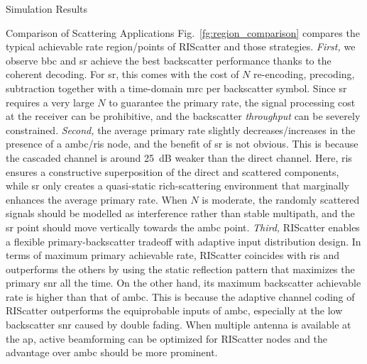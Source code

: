 \documentclass[journal]{IEEEtran}
\begin{document}
\begin{section}{Simulation Results}
\begin{subsection}{Comparison of Scattering Applications}
		Fig.~\ref{fg:region_comparison} compares the typical achievable rate region/points of RIScatter and those strategies.
		\emph{First,} we observe \gls{bbc} and \gls{sr} achieve the best backscatter performance thanks to the coherent decoding.
		For \gls{sr}, this comes with the cost of $N$ re-encoding, precoding, subtraction together with a time-domain \gls{mrc} per backscatter symbol.
		Since \gls{sr} requires a very large $N$ to guarantee the primary rate, the signal processing cost at the receiver can be prohibitive, and the backscatter \emph{throughput} can be severely constrained.
		\emph{Second,} the average primary rate slightly decreases/increases in the presence of a \gls{ambc}/\gls{ris} node, and the benefit of \gls{sr} is not obvious.
		This is because the cascaded channel is around \qty{25}{dB} weaker than the direct channel.
		Here, \gls{ris} ensures a constructive superposition of the direct and scattered components, while \gls{sr} only creates a quasi-static rich-scattering environment that marginally enhances the average primary rate.
		When $N$ is moderate, the randomly scattered signals should be modelled as interference rather than stable multipath, and the \gls{sr} point should move vertically towards the \gls{ambc} point.
		\emph{Third,} RIScatter enables a flexible primary-backscatter tradeoff with adaptive input distribution design.
		In terms of maximum primary achievable rate, RIScatter coincides with \gls{ris} and outperforms the others by using the static reflection pattern that maximizes the primary \gls{snr} all the time.
		On the other hand, its maximum backscatter achievable rate is higher than that of \gls{ambc}.
		This is because the adaptive channel coding of RIScatter outperforms the equiprobable inputs of \gls{ambc}, especially at the low backscatter \gls{snr} caused by double fading.
		When multiple antenna is available at the \gls{ap}, active beamforming can be optimized for RIScatter nodes and the advantage over \gls{ambc} should be more prominent.
	\end{subsection}


\end{section}
\end{document}
